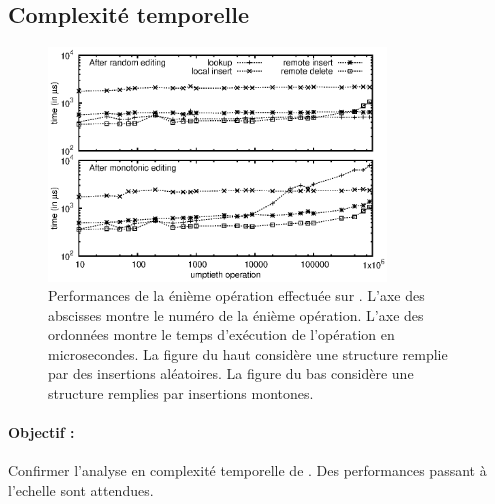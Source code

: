 \subsection{Complexité temporelle}

\begin{figure}
  \begin{center}
    \includegraphics[width=0.8\textwidth]{img/lseq/time.eps}
    \caption{\label{repl:img:time} Performances de la énième opération effectuée
      sur \LSEQ. L'axe des abscisses montre le numéro de la énième
      opération. L'axe des ordonnées montre le temps d'exécution de l'opération
      en microsecondes. La figure du haut considère une structure remplie par
      des insertions aléatoires. La figure du bas considère une structure
      remplies par insertions montones.}
  \end{center}
\end{figure}

\paragraph{Objectif :} Confirmer l'analyse en complexité temporelle de
\LSEQ. Des performances passant à l'echelle sont attendues.


